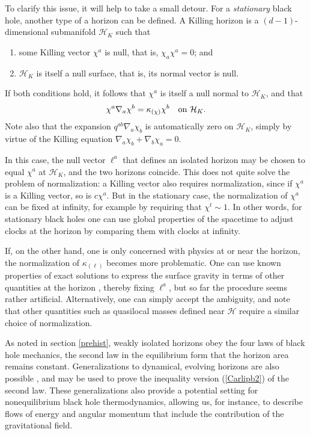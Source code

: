 \documentclass[12pt]{article}
\begin{document}
\begin{appendix}
To clarify this issue, it will help to take a small detour.  For a 
\emph{stationary} black hole, another type of a horizon can be 
defined.  A Killing horizon is a $(d-1)$-dimensional submanifold 
$\mathcal{H}_K$ such that 
\begin{enumerate}
\item some Killing vector $\chi^a$ is null, that is, $\chi_a\chi^a=0$;
and
\item $\mathcal{H}_K$ is itself a null surface, that is, its normal
vector is null.  
\end{enumerate}
If both conditions hold, it follows that $\chi^a$ is itself a null 
normal to $\mathcal{H}_K$, and that
\begin{align}
\chi^a\nabla_a\chi^b = \kappa_{(\chi)}\chi^b 
\quad\hbox{on $\mathcal{H}_K$} .
\end{align}
Note also that the expansion $q^{ab}\nabla_a\chi_b$ is automatically
zero on $\mathcal{H}_K$, simply by virtue of the Killing equation
$\nabla_a\chi_b + \nabla_b\chi_a=0$.

In this case, the null vector $\ell^a$ that defines an isolated horizon
may be chosen to equal $\chi^a$ at $\mathcal{H}_K$, and the
two horizons coincide.  This does not quite solve the problem
of normalization: a Killing vector also requires normalization,
since if $\chi^a$ is a Killing vector, so is $c\chi^a$.  But in the
stationary case, the normalization of $\chi^a$ can be fixed at
infinity, for example by requiring that $\chi^t\sim1$.  In other
words, for stationary black holes one can use global properties 
of the spacetime to adjust clocks at the horizon by comparing 
them with clocks at infinity.  

If, on the other hand, one is only concerned with physics at or 
near the horizon, the normalization of $\kappa_{(\ell)}$ becomes 
more problematic.  One can use known properties of exact solutions 
to express the surface gravity in terms of other quantities at the 
horizon \cite{AshKrish}, thereby fixing $\ell^a$, but so far the 
procedure seems rather artificial.  Alternatively, one can simply
accept the ambiguity, and note that other quantities such as
quasilocal masses defined near $\mathcal{H}$ require a
similar choice of normalization.

As noted in section \ref{prehist}, weakly isolated horizons obey 
the four laws of black hole mechanics, the second law in the  
equilibrium form that the horizon area remains constant.  Generalizations
to dynamical, evolving horizons are also possible \cite{AshKrish}, 
and may be used to prove the inequality version (\ref{Carlipb2})
of the second law.  These generalizations also
provide a potential setting for nonequilibrium black hole 
thermodynamics, allowing us, for instance, to describe  
flows of energy and angular momentum that include the 
contribution of the gravitational field.

\end{appendix}
\end{document}
